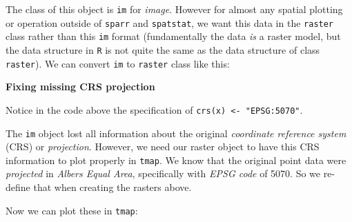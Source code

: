 \documentclass[
]{book}
\newenvironment{Shaded}{\begin{snugshade}}{\end{snugshade}}
\newcommand{\FunctionTok}[1]{\textcolor[rgb]{0.13,0.29,0.53}{\textbf{#1}}}
\newcommand{\NormalTok}[1]{#1}
\newcommand{\OtherTok}[1]{\textcolor[rgb]{0.56,0.35,0.01}{#1}}
\newcommand{\SpecialCharTok}[1]{\textcolor[rgb]{0.81,0.36,0.00}{\textbf{#1}}}
\newcommand{\StringTok}[1]{\textcolor[rgb]{0.31,0.60,0.02}{#1}}
\newenvironment{rmdtip}[1]
  {
  \begin{itemize}
  \renewcommand{\labelitemi}{
    \raisebox{-.7\height}[0pt][0pt]{
      {\setkeys{Gin}{width=3em,keepaspectratio}\texttt{[image: images/\#1]}}
    }
  }
  \setlength{\fboxsep}{1em}
  \begin{tip}
  \item
  }
  {
  \end{tip}
  \end{itemize}
  }
\begin{document}
The class of this object is \texttt{im} for \emph{image}. However for almost any spatial plotting or operation outside of \texttt{sparr} and \texttt{spatstat}, we want this data in the \texttt{raster} class rather than this \texttt{im} format (fundamentally the data \emph{is} a raster model, but the data structure in \texttt{R} is not quite the same as the data structure of class \texttt{raster}). We can convert \texttt{im} to \texttt{raster} class like this:

\begin{Shaded}
\end{Shaded}

\begin{rmdtip}{tip}
\textbf{Fixing missing CRS projection}

Notice in the code above the specification of \texttt{crs(x)\ \textless{}-\ "EPSG:5070"}.

The \texttt{im} object lost all information about the original \emph{coordinate reference system} (CRS) or \emph{projection}. However, we need our raster object to have this CRS information to plot properly in \texttt{tmap}. We know that the original point data were \emph{projected} in \emph{Albers Equal Area}, specifically with \emph{EPSG code} of 5070. So we re-define that when creating the rasters above.

\end{rmdtip}

Now we can plot these in \texttt{tmap}:
\end{document}
